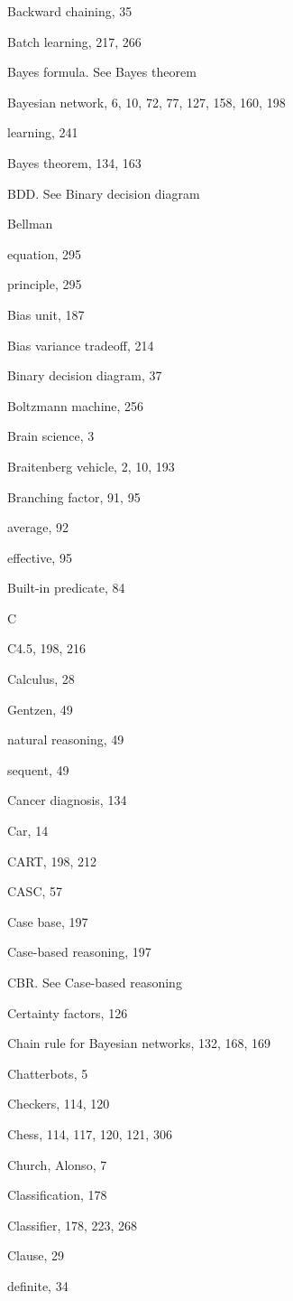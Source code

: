 \documentclass[10pt]{book}
\begin{document}
Backward chaining, 35

Batch learning, 217, 266

Bayes formula. See Bayes theorem

Bayesian network, 6, 10, 72, 77, 127, 158, 160, 198

learning, 241

Bayes theorem, 134, 163

BDD. See Binary decision diagram

Bellman

equation, 295

principle, 295

Bias unit, 187

Bias variance tradeoff, 214

Binary decision diagram, 37

Boltzmann machine, 256

Brain science, 3

Braitenberg vehicle, 2, 10, 193

Branching factor, 91, 95

average, 92

effective, 95

Built-in predicate, 84

C

C4.5, 198, 216

Calculus, 28

Gentzen, 49

natural reasoning, 49

sequent, 49

Cancer diagnosis, 134

Car, 14

CART, 198, 212

CASC, 57

Case base, 197

Case-based reasoning, 197

CBR. See Case-based reasoning

Certainty factors, 126

Chain rule for Bayesian networks, 132, 168, 169

Chatterbots, 5

Checkers, 114, 120

Chess, 114, 117, 120, 121, 306

Church, Alonso, 7

Classification, 178

Classifier, 178, 223, 268

Clause, 29

definite, 34
\end{document}

